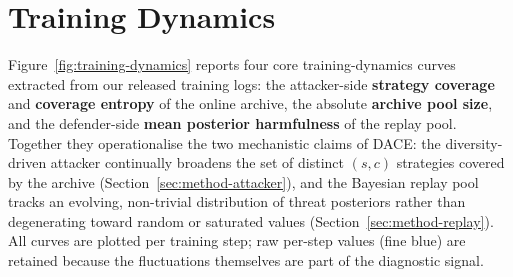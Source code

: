 \documentclass{article}
\newcommand{\method}{\textsc{DACE}\xspace}
\begin{document}
\section{Training Dynamics}
\label{apdx:training-dynamics}

Figure~\ref{fig:training-dynamics} reports four core training-dynamics curves extracted from our released training logs: the attacker-side \textbf{strategy coverage} and \textbf{coverage entropy} of the online archive, the absolute \textbf{archive pool size}, and the defender-side \textbf{mean posterior harmfulness} of the replay pool. Together they operationalise the two mechanistic claims of \method: the diversity-driven attacker continually broadens the set of distinct $(s,c)$ strategies covered by the archive (Section~\ref{sec:method-attacker}), and the Bayesian replay pool tracks an evolving, non-trivial distribution of threat posteriors rather than degenerating toward random or saturated values (Section~\ref{sec:method-replay}). All curves are plotted per training step; raw per-step values (fine blue) are retained because the fluctuations themselves are part of the diagnostic signal.
\end{document}
